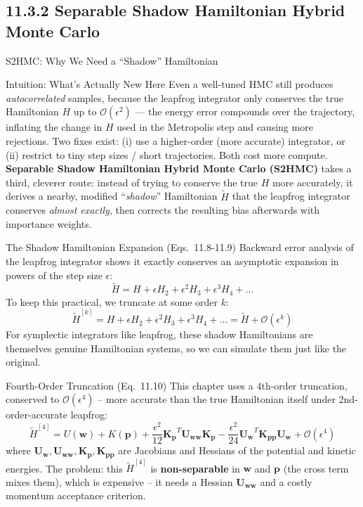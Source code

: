 \documentclass[aspectratio=169,10pt]{beamer}
\newcommand{\ww}{\mathbf{w}}
\newcommand{\pp}{\mathbf{p}}
\begin{document}
\subsection{11.3.2 Separable Shadow Hamiltonian Hybrid Monte Carlo}

\begin{frame}[allowframebreaks]{S2HMC: Why We Need a ``Shadow'' Hamiltonian}

\begin{block}{Intuition: What's Actually New Here}
  Even a well-tuned HMC still produces \emph{autocorrelated} samples,
  because the leapfrog integrator only conserves the true Hamiltonian $H$
  up to $\mathcal{O}(\epsilon^2)$ --- the energy error compounds over the
  trajectory, inflating the change in $H$ used in the Metropolis step and
  causing more rejections. Two fixes exist: (i) use a higher-order (more
  accurate) integrator, or (ii) restrict to tiny step sizes / short
  trajectories. Both cost more compute. \textbf{Separable Shadow
  Hamiltonian Hybrid Monte Carlo (S2HMC)} takes a third, cleverer route:
  instead of trying to conserve the true $H$ more accurately, it derives a
  nearby, modified ``\emph{shadow}'' Hamiltonian $\tilde H$ that the
  leapfrog integrator conserves \emph{almost exactly}, then corrects the
  resulting bias afterwards with importance weights.
\end{block}

\begin{block}{The Shadow Hamiltonian Expansion (Eqs.\ 11.8-11.9)}
  Backward error analysis of the leapfrog integrator shows it exactly
  conserves an asymptotic expansion in powers of the step size $\epsilon$:
  \[
    \tilde H = H + \epsilon H_2 + \epsilon^2 H_3 + \epsilon^3 H_4 + \dots
  \]
  To keep this practical, we truncate at some order $k$:
  \[
    \tilde H^{[k]} = H + \epsilon H_2 + \epsilon^2 H_3 + \epsilon^3 H_4 + \dots = \tilde H + \mathcal{O}(\epsilon^k)
  \]
  For symplectic integrators like leapfrog, these shadow Hamiltonians are
  themselves genuine Hamiltonian systems, so we can simulate them just like
  the original.
\end{block}

\framebreak

\begin{block}{Fourth-Order Truncation (Eq.\ 11.10)}
  This chapter uses a 4th-order truncation, conserved to
  $\mathcal{O}(\epsilon^4)$ -- more accurate than the true Hamiltonian
  itself under 2nd-order-accurate leapfrog:
  \[
    \tilde H^{[4]} = U(\ww) + K(\pp) + \frac{\epsilon^2}{12}\mathbf{K_p}^T \mathbf{U_{ww}} \mathbf{K_p}
    - \frac{\epsilon^2}{24}\mathbf{U_w}^T \mathbf{K_{pp}} \mathbf{U_w} + \mathcal{O}(\epsilon^4)
  \]
  where $\mathbf{U_w}, \mathbf{U_{ww}}, \mathbf{K_p}, \mathbf{K_{pp}}$ are
  Jacobians and Hessians of the potential and kinetic energies. The problem:
  this $\tilde H^{[4]}$ is \textbf{non-separable} in $\ww$ and $\pp$ (the
  cross term mixes them), which is expensive -- it needs a Hessian
  $\mathbf{U_{ww}}$ and a costly momentum acceptance criterion.
\end{block}


\end{frame}
\end{document}
